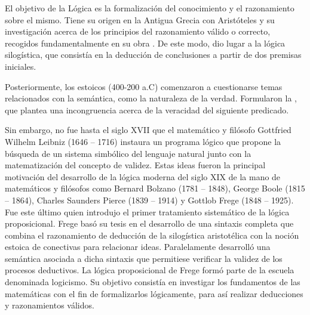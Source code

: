 %
\begin{isabellebody}%
%
%
\isadelimtheory
%
\endisadelimtheory
%
\isatagtheory
%
\endisatagtheory
{\isafoldtheory}%
%
\isadelimtheory
%
\endisadelimtheory
%
\begin{isamarkuptext}%
El objetivo de la Lógica es la formalización del conocimiento y el 
  razonamiento sobre el mismo. Tiene su origen en la Antigua Grecia con 
  Aristóteles y su investigación acerca de los principios del 
  razonamiento válido o correcto, recogidos fundamentalmente en su obra 
  . De este modo, dio lugar a la lógica silogística, que 
  consistía en la deducción de conclusiones a partir de dos premisas 
  iniciales. 

	Posteriormente, los estoicos (400-200 a.C) comenzaron a cuestionarse 
  temas relacionados con la semántica, como la naturaleza de la verdad. 
  Formularon la , que plantea una incongruencia 
  acerca de la veracidad del siguiente predicado.


  Sin embargo, no fue hasta el siglo XVII que el matemático y filósofo 
  Gottfried Wilhelm Leibniz (1646 – 1716) instaura un programa lógico 
  que propone la búsqueda de un sistema simbólico del lenguaje natural 
  junto con la matematización del concepto de validez. Estas ideas 
  fueron la principal motivación del desarrollo de la lógica moderna del 
  siglo XIX de la mano de matemáticos y filósofos como Bernard Bolzano 
  (1781 – 1848), George Boole (1815 – 1864), Charles Saunders Pierce 
  (1839 – 1914) y Gottlob Frege (1848 – 1925). Fue este último quien 
  introdujo el primer tratamiento sistemático de la lógica 
  proposicional. Frege basó su tesis en el desarrollo de una sintaxis 
  completa que combina el razonamiento de deducción de la silogística 
  aristotélica con la noción estoica de conectivas para relacionar 
  ideas. Paralelamente desarrolló una semántica asociada a dicha 
  sintaxis que permitiese verificar la validez de los procesos 
  deductivos. La lógica proposicional de Frege formó parte de la 
  escuela denominada logicismo. Su objetivo consistía en investigar 
  los fundamentos de las matemáticas con el fin de formalizarlos 
  lógicamente, para así realizar deducciones y razonamientos 
  válidos.


\end{isamarkuptext}
\end{isabellebody}
